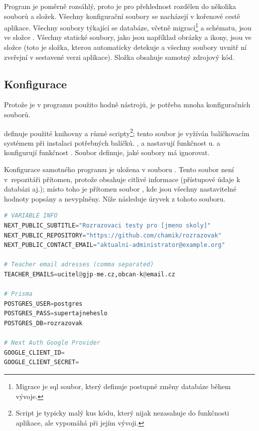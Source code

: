 Program je poměrně rozsáhlý, proto je pro přehlednost rozdělen do několika souborů a složek. Všechny konfigurační soubory se nacházejí v kořenové cestě aplikace. Všechny soubory týkající se databáze, včetně migrací\footnote{Migrace je sql soubor, který definuje postupné změny databáze během vývoje.} a schématu, jsou ve složce . Všechny statické soubory, jako jsou například obrázky a ikony, jsou ve složce  (toto je složka, kterou  automaticky detekuje a všechny soubory uvnitř ní zveřejní v sestavené verzi aplikace). Složka  obsahuje samotný zdrojový kód.

\subsection{Konfigurace}
\label{sec:config}

Protože je v programu použito hodně nástrojů, je potřeba mnoha konfiguračních souborů.

 definuje použité knihovny a různé scripty\footnote{Script je typicky malý kus kódu, který nijak nezasahuje do funkčnosti aplikace, ale vypomáhá při jejím vývoji.}; tento soubor je vyžíván balíčkovacím systémem  při instalaci potřebných balíčků. ,  a  nastavují funkčnost u.  a  konfigurují funkčnost . Soubor  definuje, jaké soubory má  ignorovat.

Konfigurace samotného programu je uložena v souboru . Tento soubor není v~repozitáři přítomen, protože obsahuje citlivé informace (přístupové údaje k databázi aj.); místo toho je přítomen soubor , kde jsou všechny nastavitelné hodnoty popsány a nevyplněny. Níže následuje úryvek z tohoto souboru.

\begin{lstlisting}[language=Python,caption={Úryvek ukázky konfiguračního souboru programu}]
# VARIABLE INFO
NEXT_PUBLIC_SUBTITLE="Rozrazovaci testy pro [jmeno skoly]"
NEXT_PUBLIC_REPOSITORY="https://github.com/chamik/rozrazovak"
NEXT_PUBLIC_CONTACT_EMAIL="aktualni-administrator@example.org"

# Teacher email adresses (comma separated)
TEACHER_EMAILS=ucitel@gjp-me.cz,obcan-k@email.cz

# Prisma
POSTGRES_USER=postgres
POSTGRES_PASS=supertajneheslo
POSTGRES_DB=rozrazovak

# Next Auth Google Provider
GOOGLE_CLIENT_ID=
GOOGLE_CLIENT_SECRET=
\end{lstlisting}

